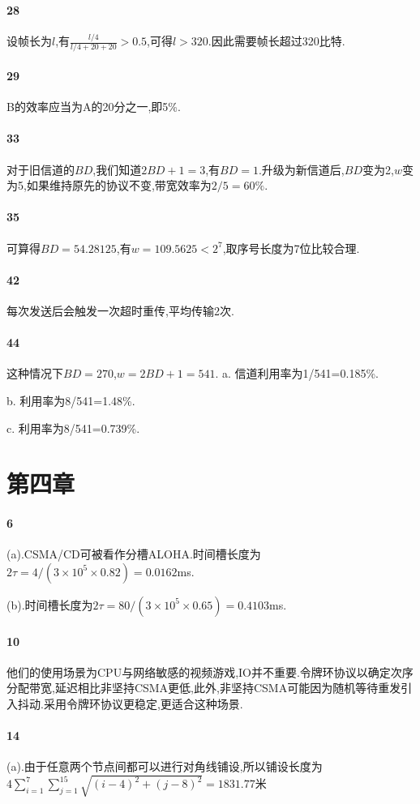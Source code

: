 \documentclass[a4paper]{article}
\begin{document}
\paragraph{28}
设帧长为$l$,有$\frac{l/4}{l/4+20+20}>0.5$,可得$l>320$.因此需要帧长超过320比特.
\paragraph{29}
B的效率应当为A的20分之一,即5\%.
\paragraph{33}
对于旧信道的$BD$,我们知道$2BD+1=3$,有$BD=1$.升级为新信道后,$BD$变为2,$w$变为5,如果维持原先的协议不变,带宽效率为$2/5=60\%$.
\paragraph{35}
可算得$BD=54.28125$,有$w=109.5625<2^7$,取序号长度为7位比较合理.
\paragraph{42}
每次发送后会触发一次超时重传,平均传输2次.
\paragraph{44}这种情况下$BD=270$,$w=2BD+1=541$.
a. 信道利用率为1/541=0.185\%.

b. 利用率为8/541=1.48\%.

c. 利用率为8/541=0.739\%.
\section{第四章}
\paragraph{6} (a).CSMA/CD可被看作分槽ALOHA.时间槽长度为$2\tau=4/(3\times10^5\times0.82)=0.0162$ms.

(b).时间槽长度为$2\tau=80/(3\times10^5\times0.65)=0.4103$ms.
\paragraph{10}
他们的使用场景为CPU与网络敏感的视频游戏,IO并不重要.令牌环协议以确定次序分配带宽,延迟相比非坚持CSMA更低,此外,非坚持CSMA可能因为随机等待重发引入抖动.采用令牌环协议更稳定,更适合这种场景.
\paragraph{14}
(a).由于任意两个节点间都可以进行对角线铺设,所以铺设长度为$4\sum_{i=1}^7\sum_{j=1}^{15}\sqrt{(i-4)^2+(j-8)^2}=1831.77$米
\end{document}
